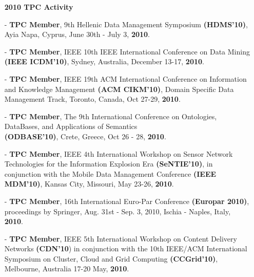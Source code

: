 \documentclass[10pt]{article}
\begin{document}
\begin{itemize}
\begin{itemize}
%
\vspace{0.1in}
\item[]{\bf 2010 TPC Activity\hrulefill }
%
\item[-] {\bf TPC Member}, 9th Hellenic Data Management Symposium {\bf (HDMS'10)}, Ayia Napa, Cyprus, June 30th - July 3, {\bf 2010}.
\item[-] {\bf TPC Member}, IEEE 10th IEEE International Conference on Data Mining {\bf (IEEE ICDM'10)}, Sydney, Australia, December 13-17, {\bf 2010}.
\item[-] {\bf TPC Member}, IEEE 19th ACM International Conference on Information and Knowledge Management {\bf (ACM CIKM'10)}, Domain Specific Data Management Track, Toronto, Canada, Oct 27-29, {\bf 2010}.
\item[-] {\bf TPC Member}, The 9th International Conference on Ontologies, DataBases, and Applications of Semantics  \\
{\bf (ODBASE'10)}, Crete, Greece, Oct 26 - 28, {\bf 2010}.
\item[-] {\bf TPC Member}, IEEE 4th International Workshop on Sensor Network Technologies for the Information Explosion Era {\bf (SeNTIE'10)}, in conjunction with the Mobile Data Management Conference {\bf (IEEE MDM'10)}, Kansas City, Missouri, May 23-26, {\bf 2010}.
\item[-] {\bf TPC Member}, 16th International Euro-Par Conference {\bf (Europar 2010)}, proceedings by Springer, Aug. 31st - Sep. 3, 2010, Ischia - Naples, Italy, {\bf 2010}.
\item[-] {\bf TPC Member}, IEEE 5th International Workshop on Content Delivery Networks {\bf (CDN'10}) in conjunction with the 10th IEEE/ACM International Symposium on Cluster, Cloud and Grid Computing {\bf (CCGrid'10)}, Melbourne, Australia 17-20 May, {\bf 2010}.\


\end{itemize}
\end{itemize}
\end{document}
